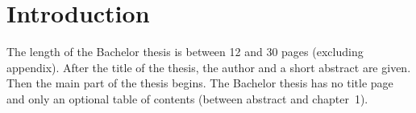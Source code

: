 \chapter{Introduction}

The length of the Bachelor thesis is between 12 and 30 pages (excluding appendix).
After the title of the thesis, the author and a short abstract are given.
Then the main part of the thesis begins.
The Bachelor thesis has no title page and only an optional table of contents
(between abstract and chapter~1).